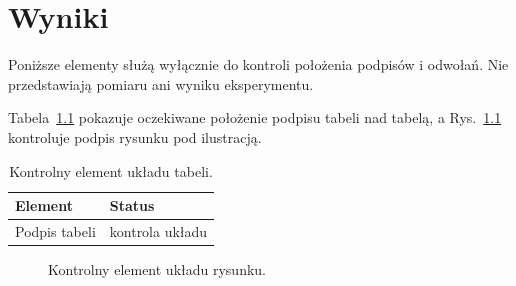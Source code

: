 \chapter{Wyniki}

Poniższe elementy służą wyłącznie do kontroli położenia podpisów i odwołań. Nie przedstawiają pomiaru ani wyniku eksperymentu.

Tabela~\ref{tab:layout-check} pokazuje oczekiwane położenie podpisu tabeli nad tabelą, a Rys.~\ref{fig:layout-check} kontroluje podpis rysunku pod ilustracją.

\begin{table}[!htbp]
  \centering
  \caption{Kontrolny element układu tabeli.}
  \label{tab:layout-check}
  \begin{tabular}{l l}
    Element & Status\\ \hline
    Podpis tabeli & kontrola układu\\
  \end{tabular}
\end{table}

\begin{figure}[!htbp]
  \centering
  \fbox{\rule{0pt}{35mm}\rule{80mm}{0pt}}
  \caption{Kontrolny element układu rysunku.}
  \label{fig:layout-check}
\end{figure}
